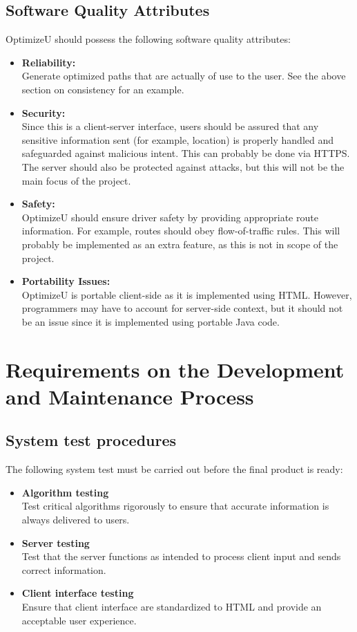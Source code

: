 \documentclass[12pt]{article}
\begin{document}
\subsection{Software Quality Attributes}
OptimizeU should possess the following software quality attributes:
\begin{itemize}
	\item \textbf{Reliability:}\\
		Generate optimized paths that are actually of use to the user. See the above
		section on consistency for an example.
	\item \textbf{Security:}\\
		Since this is a client-server interface, users should be assured that 
		any sensitive information sent (for example, location) is properly handled
		and safeguarded against malicious intent. This can probably be done via
		HTTPS. The server should also be protected against attacks, but this will
		not be the main focus of the project.
	\item \textbf{Safety:}\\
		OptimizeU should ensure driver safety by providing appropriate route information.
		For example, routes should obey flow-of-traffic rules. This will probably
		be implemented as an extra feature, as this is not in scope of the project.
	\item \textbf{Portability Issues:}\\
		OptimizeU is portable client-side as it is implemented using HTML. However,
		programmers may have to account for server-side context, but it should not
		be an issue since it is implemented using portable Java code.
\end{itemize}
\section{Requirements on the Development and Maintenance Process}
\subsection{System test procedures}
The following system test must be carried out before the final product is ready:
\begin{itemize}
	\item \textbf{Algorithm testing}\\
		Test critical algorithms rigorously to ensure that accurate information
		is always delivered to users.
	\item \textbf{Server testing}\\
		Test that the server functions as intended to process client input and
		sends correct information.
	\item \textbf{Client interface testing}\\
		Ensure that client interface are standardized to HTML and provide
		an acceptable user experience.
\end{itemize}
\end{document}
